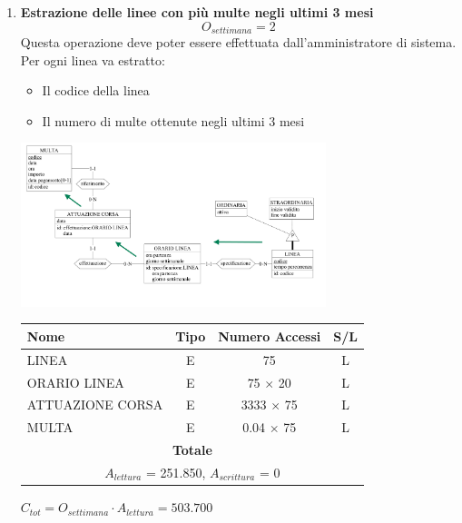 \documentclass[12pt,a4paper]{report}
\begin{document}
\begin{enumerate}[label=\textbf{\arabic*)}]

    \item\textbf{Estrazione delle linee con più multe negli ultimi 3 mesi} \label{op11} \\
	\[{O_{settimana} = 2}\]
	Questa operazione deve poter essere effettuata dall'amministratore di sistema.\\
	Per ogni linea va estratto:
	\begin{itemize}
	\renewcommand\labelitemi{--}
	    \item Il codice della linea
	    \item Il numero di multe ottenute negli ultimi 3 mesi
	\end{itemize}
	\begin{center}
	\includegraphics[width=0.7\textwidth]{VisualLineeConPiuMulte}
	\end{center}

	\begin{table}[H]
	\centering
	\begin{tabular}{|l|c|c|c|}
	\hline
	Nome & Tipo & Numero Accessi & S/L \\
	\hline
	LINEA & E & 75 & L \\
	\hline
	ORARIO LINEA & E & 75 $\times$ 20 & L \\
	\hline
	ATTUAZIONE CORSA & E & 3333 $\times$ 75 & L \\
	\hline
	MULTA & E & 0.04 $\times$ 75 & L \\
	    \hline
	    \multicolumn{4}{c}{\textbf{Totale}} \\
	    \multicolumn{4}{c}{${A_{lettura}}$ = 251.850, ${A_{scrittura}}$ = 0} \\
	    \hline
	\end{tabular}
	\end{table}
	    \begin{center}
	    ${C_{tot} = {O_{settimana}}\cdot{A_{lettura}}= 503.700}$
	    \end{center}



\end{enumerate}
\end{document}
